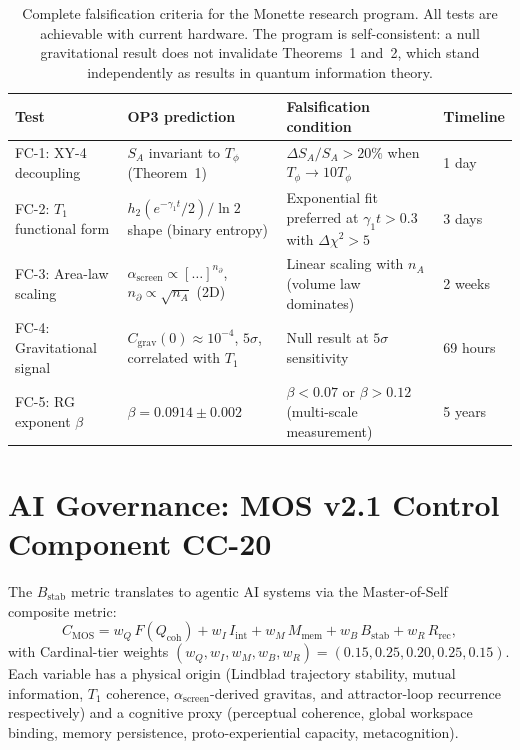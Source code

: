 \documentclass[12pt,a4paper]{article}
\theoremstyle{monette}
\theoremstyle{definition}
\newcommand{\SA}{S_A}
\newcommand{\asc}{\alpha_{\mathrm{screen}}}
\newcommand{\htwo}{h_2}
\newcommand{\Bstab}{B_{\mathrm{stab}}}
\newcommand{\CMOS}{C_{\mathrm{MOS}}}
\newcommand{\nprt}{n_{\partial}}
\newcommand{\gamone}{\gamma_1}
\newcommand{\Tone}{T_1}
\newcommand{\Tphi}{T_\phi}
\begin{document}
\begin{table}[h!]
\centering
\caption{Complete falsification criteria for the Monette research program.
All tests are achievable with current hardware. The program is self-consistent:
a null gravitational result does not invalidate Theorems~1 and~2, which stand
independently as results in quantum information theory.}
\label{tab:falsification}
\begin{tabular}{p{2.5cm}p{4.2cm}p{4.2cm}p{2cm}}
\toprule
\textbf{Test} & \textbf{OP3 prediction} & \textbf{Falsification condition} & \textbf{Timeline} \\
\midrule
FC-1: XY-4 decoupling
  & $\SA$ invariant to $\Tphi$ (Theorem~1)
  & $\Delta\SA/\SA > 20\%$ when $\Tphi \to 10\Tphi$
  & 1 day \\
\midrule
FC-2: $\Tone$ functional form
  & $\htwo(e^{-\gamone t}/2)/\ln 2$ shape (binary entropy)
  & Exponential fit preferred at $\gamone t > 0.3$ with $\Delta\chi^2 > 5$
  & 3 days \\
\midrule
FC-3: Area-law scaling
  & $\asc \propto [\ldots]^{\nprt}$, $\nprt \propto \sqrt{n_A}$ (2D)
  & Linear scaling with $n_A$ (volume law dominates)
  & 2 weeks \\
\midrule
FC-4: Gravitational signal
  & $C_{\mathrm{grav}}(0) \approx 10^{-4}$, $5\sigma$, correlated with $\Tone$
  & Null result at $5\sigma$ sensitivity
  & 69 hours \\
\midrule
FC-5: RG exponent $\beta$
  & $\beta = 0.0914 \pm 0.002$
  & $\beta < 0.07$ or $\beta > 0.12$ (multi-scale measurement)
  & 5 years \\
\bottomrule
\end{tabular}
\end{table}

\section{AI Governance: MOS v2.1 Control Component CC-20}
\label{sec:governance}

The $\Bstab$ metric translates to agentic AI systems via the
Master-of-Self composite metric:
\begin{equation}
  \CMOS = w_Q\,F(Q_{\mathrm{coh}})
    + w_I\,I_{\mathrm{int}}
    + w_M\,M_{\mathrm{mem}}
    + w_B\,\Bstab
    + w_R\,R_{\mathrm{rec}},
  \label{eq:CMOS}
\end{equation}
with Cardinal-tier weights $(w_Q, w_I, w_M, w_B, w_R) = (0.15, 0.25, 0.20, 0.25, 0.15)$.
Each variable has a physical origin (Lindblad trajectory stability, mutual information,
$\Tone$ coherence, $\asc$-derived gravitas, and attractor-loop recurrence respectively)
and a cognitive proxy (perceptual coherence, global workspace binding, memory persistence,
proto-experiential capacity, metacognition).
\end{document}

